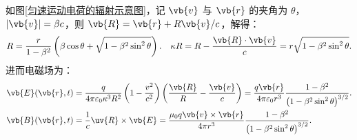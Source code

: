 如图\ref{匀速运动电荷的辐射示意图}，记 \(\vb{v}\) 与 \(\vb{r}\) 的夹角为 \(\theta\)，\(|\vb{v}| = \beta c\)，则 \(\vb{R} = \vb{r} + R \vb{v}/c\)，解得：
\begin{equation*}
	R = \dfrac{r}{1 - \beta^2} \left( \beta \cos\theta + \sqrt{1 - \beta^2 \sin^2\theta} \right). \quad \kappa R = R - \dfrac{\vb{R} \cdot \vb{v}}{c} = r \sqrt{1 - \beta^2 \sin^2\theta}.
\end{equation*}
进而电磁场为：
\begin{align*}
	\vb{E}(\vb{r}, t) &= \dfrac{q}{4\pi \varepsilon_0 \kappa^3 R^2} \left(1 - \dfrac{v^2}{c^2}\right) \left( \dfrac{\vb{R}}{R} - \dfrac{\vb{v}}{c} \right) = \dfrac{q \vb{r}}{4\pi \varepsilon_0 r^3} \dfrac{1 - \beta^2}{\left(1 - \beta^2 \sin^2\theta\right)^{3/2}}.\\
	\vb{B}(\vb{r}, t) &= \dfrac{1}{c} \uv{R} \times \vb{E} = \dfrac{\mu_0 q \vb{v} \times \vb{r}}{4\pi r^3} \dfrac{1 - \beta^2}{\left(1 - \beta^2 \sin^2\theta\right)^{3/2}}.
\end{align*}

